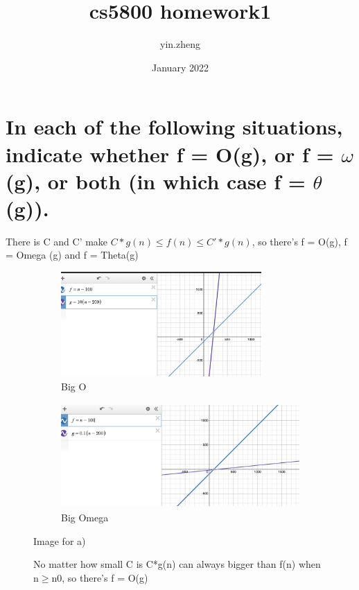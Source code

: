 \documentclass{article}
\title{cs5800 homework1}
\author{yin.zheng }
\date{January 2022}
\begin{document}
\maketitle
\section{
In each of the following situations, indicate whether f = O(g), or f = $\omega$(g), or both (in which case f = $\theta$(g)).}

\begin{enumerate}[label=(\alph*)]
\item 
There is C and C' make $C*g(n) \le f(n) \le C'*g(n)$, so  there's f = O(g), f = Omega (g) and f = Theta(g) \\%
    \begin{figure}[h]
    \begin{subfigure}{0.5\textwidth}
    \includegraphics[width=0.9\linewidth, height=4cm]{a)big O.png}     
    \caption{Big O}
    \end{subfigure}
    \begin{subfigure}{0.5\textwidth}
    \includegraphics[width=0.9\linewidth, height=4cm]{a) big omega.png}
    \caption{Big Omega}
    \label{fig:subim2}
    \end{subfigure}
    \caption{Image for a)}
    \label{fig:image2}
    \end{figure}
\begin{figure}[h]
\item 
No matter how small C is C*g(n) can always bigger than f(n) when n$\ge$n0, so there's f = O(g)  %
    

\end{figure}
\end{enumerate}
\end{document}
